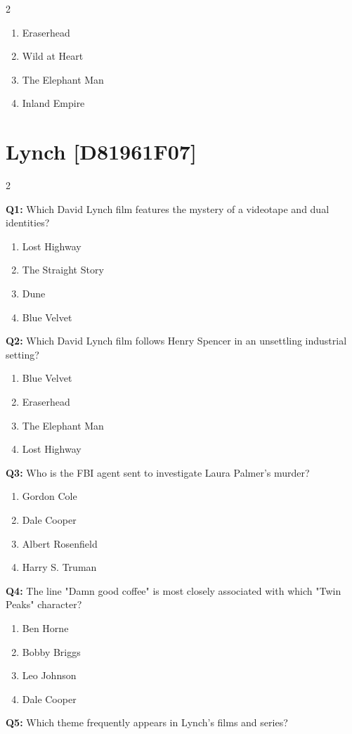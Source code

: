\documentclass[10pt]{article}
\begin{document}
\begin{multicols}{2}
\begin{enumerate}[label=\arabic*.]
\item Eraserhead
\item Wild at Heart
\item The Elephant Man
\item Inland Empire
\end{enumerate}
\end{multicols}

\newpage

\section*{Lynch \footnotesize [D81961F07]}
\begin{multicols}{2}

\textbf{Q1:} Which David Lynch film features the mystery of a videotape and dual identities?

\begin{enumerate}[label=\arabic*.]
\item Lost Highway
\item The Straight Story
\item Dune
\item Blue Velvet
\end{enumerate}
\textbf{Q2:} Which David Lynch film follows Henry Spencer in an unsettling industrial setting?

\begin{enumerate}[label=\arabic*.]
\item Blue Velvet
\item Eraserhead
\item The Elephant Man
\item Lost Highway
\end{enumerate}
\textbf{Q3:} Who is the FBI agent sent to investigate Laura Palmer's murder?

\begin{enumerate}[label=\arabic*.]
\item Gordon Cole
\item Dale Cooper
\item Albert Rosenfield
\item Harry S. Truman
\end{enumerate}
\textbf{Q4:} The line "Damn good coffee" is most closely associated with which "Twin Peaks" character?

\begin{enumerate}[label=\arabic*.]
\item Ben Horne
\item Bobby Briggs
\item Leo Johnson
\item Dale Cooper
\end{enumerate}
\textbf{Q5:} Which theme frequently appears in Lynch's films and series?


\end{multicols}
\end{document}
